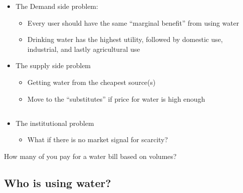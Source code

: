 \documentclass[]{article}
\providecommand{\tightlist}{%
  \setlength{\itemsep}{0pt}\setlength{\parskip}{0pt}}
\begin{document}
\begin{itemize}
\tightlist
\item
  The Demand side problem:

  \begin{itemize}
  \tightlist
  \item
    Every user should have the same ``marginal benefit'' from using
    water
  \item
    Drinking water has the highest utility, followed by domestic use,
    industrial, and lastly agricultural use
  \end{itemize}
\item
  The supply side problem

  \begin{itemize}
  \tightlist
  \item
    Getting water from the cheapest source(s)
  \item
    Move to the ``substitutes'' if price for water is high enough
  \end{itemize}
\end{itemize}

\hypertarget{section-15}{%
\subsection{}\label{section-15}}

\begin{itemize}
\tightlist
\item
  The institutional problem

  \begin{itemize}
  \tightlist
  \item
    What if there is no market signal for scarcity?
  \end{itemize}
\end{itemize}

How many of you pay for a water bill based on volumes?

\hypertarget{who-is-using-water}{%
\subsection{Who is using water?}\label{who-is-using-water}}

\hypertarget{section-16}{%
\subsection{}\label{section-16}}
\end{document}
